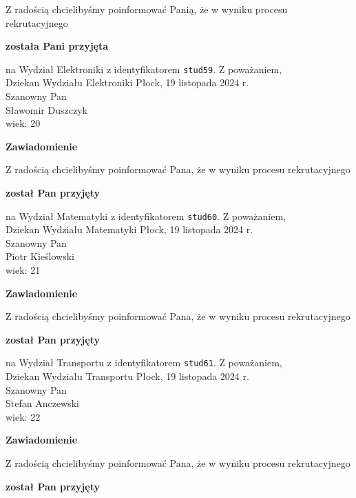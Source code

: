 \documentclass[12pt,a4paper]{article}
\begin{document}
\bigskip 
Z radością chcielibyśmy poinformować Panią, że w wyniku procesu rekrutacyjnego
\begin{center}
\textsf{\textbf{została Pani przyjęta}}
\end{center}
na Wydział Elektroniki z identyfikatorem \verb|stud59|. 
\vspace{2cm}
\noindent
Z poważaniem, \\
Dziekan
Wydziału Elektroniki
\newpage
\hfill Płock, 19 listopada 2024 r. \\
\noindent
Szanowny Pan \\
Sławomir Duszczyk \\
wiek: 20
\bigskip
\begin{center}
    {\Large\textbf{Zawiadomienie}}
\end{center}
\bigskip 
Z radością chcielibyśmy poinformować Pana, że w wyniku procesu rekrutacyjnego
\begin{center}
\textsf{\textbf{został Pan przyjęty}}
\end{center}
na Wydział Matematyki z identyfikatorem \verb|stud60|. 
\vspace{2cm}
\noindent
Z poważaniem, \\
Dziekan
Wydziału Matematyki
\newpage
\hfill Płock, 19 listopada 2024 r. \\
\noindent
Szanowny Pan \\
Piotr Kieślowski \\
wiek: 21
\bigskip
\begin{center}
    {\Large\textbf{Zawiadomienie}}
\end{center}
\bigskip 
Z radością chcielibyśmy poinformować Pana, że w wyniku procesu rekrutacyjnego
\begin{center}
\textsf{\textbf{został Pan przyjęty}}
\end{center}
na Wydział Transportu z identyfikatorem \verb|stud61|. 
\vspace{2cm}
\noindent
Z poważaniem, \\
Dziekan
Wydziału Transportu
\newpage
\hfill Płock, 19 listopada 2024 r. \\
\noindent
Szanowny Pan \\
Stefan Anczewski \\
wiek: 22
\bigskip
\begin{center}
    {\Large\textbf{Zawiadomienie}}
\end{center}
\bigskip 
Z radością chcielibyśmy poinformować Pana, że w wyniku procesu rekrutacyjnego
\begin{center}
\textsf{\textbf{został Pan przyjęty}}
\end{center}
\end{document}
